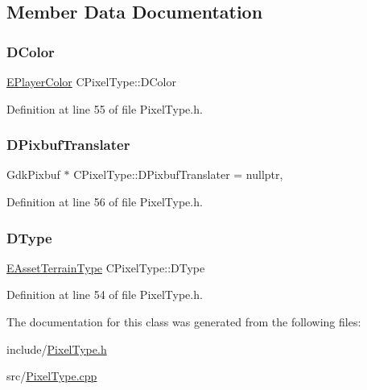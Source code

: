\subsection{Member Data Documentation}
\hypertarget{classCPixelType_a474243cf748aee94cfa207659e940b6c}{}\label{classCPixelType_a474243cf748aee94cfa207659e940b6c} 
\subsubsection{\texorpdfstring{D\+Color}{DColor}}
{\footnotesize\ttfamily \hyperlink{GameDataTypes_8h_aafb0ca75933357ff28a6d7efbdd7602f}{E\+Player\+Color} C\+Pixel\+Type\+::\+D\+Color\hspace{0.3cm}{\ttfamily [protected]}}



Definition at line 55 of file Pixel\+Type.\+h.

\hypertarget{classCPixelType_af1243e70d11325b487a215ae190db0a2}{}\label{classCPixelType_af1243e70d11325b487a215ae190db0a2} 
\subsubsection{\texorpdfstring{D\+Pixbuf\+Translater}{DPixbufTranslater}}
{\footnotesize\ttfamily Gdk\+Pixbuf $\ast$ C\+Pixel\+Type\+::\+D\+Pixbuf\+Translater = nullptr\hspace{0.3cm}{\ttfamily [static]}, {\ttfamily [protected]}}



Definition at line 56 of file Pixel\+Type.\+h.

\hypertarget{classCPixelType_aca37f042b510a349e0d3209c73ae51c5}{}\label{classCPixelType_aca37f042b510a349e0d3209c73ae51c5} 
\subsubsection{\texorpdfstring{D\+Type}{DType}}
{\footnotesize\ttfamily \hyperlink{classCPixelType_af06457fd1c2ff34c67ce670e633a10b0}{E\+Asset\+Terrain\+Type} C\+Pixel\+Type\+::\+D\+Type\hspace{0.3cm}{\ttfamily [protected]}}



Definition at line 54 of file Pixel\+Type.\+h.



The documentation for this class was generated from the following files\+:\begin{DoxyCompactItemize}
\item 
include/\hyperlink{PixelType_8h}{Pixel\+Type.\+h}\item 
src/\hyperlink{PixelType_8cpp}{Pixel\+Type.\+cpp}\end{DoxyCompactItemize}
